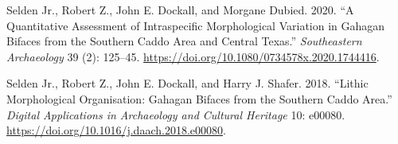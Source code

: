 \documentclass[
]{article}
\begin{document}
\leavevmode\hypertarget{ref-RN21001}{}%
Selden Jr., Robert Z., John E. Dockall, and Morgane Dubied. 2020. ``A
Quantitative Assessment of Intraspecific Morphological Variation in
Gahagan Bifaces from the Southern Caddo Area and Central Texas.''
\emph{Southeastern Archaeology} 39 (2): 125--45.
\url{https://doi.org/10.1080/0734578x.2020.1744416}.

\leavevmode\hypertarget{ref-RN11783}{}%
Selden Jr., Robert Z., John E. Dockall, and Harry J. Shafer. 2018.
``Lithic Morphological Organisation: Gahagan Bifaces from the Southern
Caddo Area.'' \emph{Digital Applications in Archaeology and Cultural
Heritage} 10: e00080. \url{https://doi.org/10.1016/j.daach.2018.e00080}.
\end{document}
